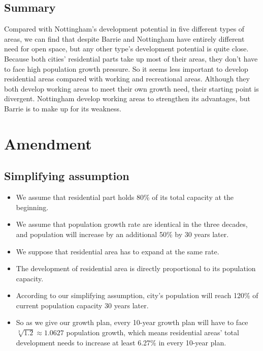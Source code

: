 \subsection{Summary}
Compared with Nottingham's development potential in five different types of areas, we can find that despite Barrie and Nottingham have entirely different need for open space, but any other type's development potential is quite close. Because both cities' residential parts take up most of their areas, they don't have to face high population growth pressure. So it seems less important to develop residential areas compared with working and recreational areas. Although they both develop working areas to meet their own growth need, their starting point is divergent. Nottingham develop working areas to strengthen its advantages, but Barrie is to make up for its weakness.


\section{Amendment}
\subsection{Simplifying assumption}
\begin{itemize}
  \item We assume that residential part holds 80\% of its total capacity at the beginning.
  \item We assume that population growth rate are identical in the three decades, and population will increase by an additional 50\% by 30 years later.
  \item We suppose that residential area has to expand at the same rate.
  \item The development of residential area is directly proportional to its population capacity.
  \item According to our simplifying assumption, city's population will reach 120\% of current population capacity 30 years later.
  \item So as we give our growth plan, every 10-year growth plan will have to face $\sqrt[3]{1.2} \approx 1.0627$ population growth, which means residential areas' total development needs to increase at least 6.27\% in every 10-year plan.
\end{itemize}

